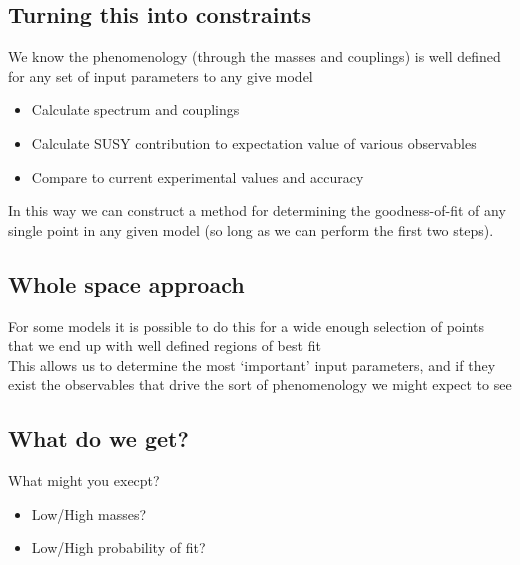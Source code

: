 \documentclass{beamer}
\begin{document}
\subsection{Turning this into constraints}
\begin{frame}{\insertsubsection}
We know the phenomenology (through the masses and couplings) is well defined for
any set of input parameters to any give model
\begin{itemize}
    \item Calculate spectrum and couplings
    \item Calculate SUSY contribution to expectation value of various
    observables
    \item Compare to current experimental values and accuracy
\end{itemize}

In this way we can construct a method for determining the goodness-of-fit of any
single point in any given model (so long as we can perform the first two steps).
\end{frame}

\subsection{Whole space approach}
\begin{frame}{\insertsubsection}
For some models it is possible to do this for a wide enough selection of points
that we end up with well defined regions of best fit\\
This allows us to determine the most `important' input parameters, and if they
exist the observables that drive the sort of phenomenology we might expect to
see
\end{frame}

\subsection{What do we get?}
\begin{frame}{\insertsubsection}
What might you execpt?
\begin{itemize}
    \item Low/High masses?
    \item Low/High probability of fit?
\end{itemize}
\end{frame}
\end{document}
